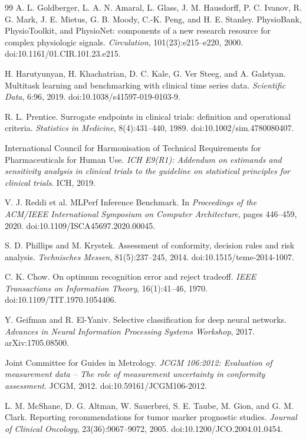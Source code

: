 \documentclass[11pt,a4paper]{article}
\newcommand{\1}{\mathbf{1}}
\begin{document}
\begin{thebibliography}{99}
A. L. Goldberger, L. A. N. Amaral, L. Glass, J. M. Hausdorff, P. C. Ivanov, R. G. Mark,
J. E. Mietus, G. B. Moody, C.-K. Peng, and H. E. Stanley.
PhysioBank, PhysioToolkit, and PhysioNet: components of a new research resource for complex physiologic signals.
\emph{Circulation}, 101(23):e215--e220, 2000.
doi:10.1161/01.CIR.101.23.e215.

H. Harutyunyan, H. Khachatrian, D. C. Kale, G. Ver Steeg, and A. Galstyan.
Multitask learning and benchmarking with clinical time series data.
\emph{Scientific Data}, 6:96, 2019.
doi:10.1038/s41597-019-0103-9.

R. L. Prentice.
Surrogate endpoints in clinical trials: definition and operational criteria.
\emph{Statistics in Medicine}, 8(4):431--440, 1989.
doi:10.1002/sim.4780080407.

International Council for Harmonisation of Technical Requirements for Pharmaceuticals for Human Use.
\emph{ICH E9(R1): Addendum on estimands and sensitivity analysis in clinical trials to the guideline on statistical principles for clinical trials}.
ICH, 2019.

V. J. Reddi et al.
MLPerf Inference Benchmark.
In \emph{Proceedings of the ACM/IEEE International Symposium on Computer Architecture}, pages 446--459, 2020.
doi:10.1109/ISCA45697.2020.00045.

S. D. Phillips and M. Krystek.
Assessment of conformity, decision rules and risk analysis.
\emph{Technisches Messen}, 81(5):237--245, 2014.
doi:10.1515/teme-2014-1007.

C. K. Chow.
On optimum recognition error and reject tradeoff.
\emph{IEEE Transactions on Information Theory}, 16(1):41--46, 1970.
doi:10.1109/TIT.1970.1054406.

Y. Geifman and R. El-Yaniv.
Selective classification for deep neural networks.
\emph{Advances in Neural Information Processing Systems Workshop}, 2017.
arXiv:1705.08500.

Joint Committee for Guides in Metrology.
\emph{JCGM 106:2012: Evaluation of measurement data -- The role of measurement uncertainty in conformity assessment}.
JCGM, 2012.
doi:10.59161/JCGM106-2012.

L. M. McShane, D. G. Altman, W. Sauerbrei, S. E. Taube, M. Gion, and G. M. Clark.
Reporting recommendations for tumor marker prognostic studies.
\emph{Journal of Clinical Oncology}, 23(36):9067--9072, 2005.
doi:10.1200/JCO.2004.01.0454.


\end{thebibliography}
\end{document}
